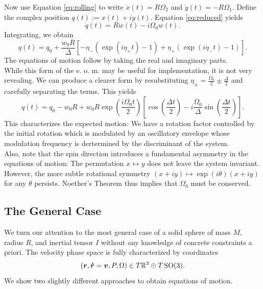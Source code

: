 Now use Equation \ref{eq:rolling} to write $\dot{x}(t)=R\Omega_2$ and $\dot{y}(t)=-R\Omega_1$. Define the complex position $q(t):=x(t)+iy(t)$. Equation \ref{eq:reduced} yields \[
    \dot{q}(t)= R\dot{w}(t)-i\Omega_0 w(t)
.\] Integrating, we obtain
\[
    q(t)=q_0 + \frac{w_0R}{\Delta}\left[-\eta_- (\exp(i\eta_+ t)-1)+\eta_+ (\exp(i\eta_-t)-1)\right]
.\] 
The equations of motion follow by taking the real and imaginary parts.\\
While this form of the e. o. m. may be useful for implementation, it is not very revealing. We can produce a clearer form by resubstituting $\eta_\pm = \frac{\Omega_0}{2} \pm \frac{\Delta}{2}$ and carefully separating the terms. This yields \[
    q(t)=q_0-w_0R+w_0R \exp\left(\frac{i\Omega_0t}{2}\right)\left[ \cos \left( \frac{\Delta t}{2}\right)- i\frac{\Omega_0}{\Delta} \sin\left( \frac{\Delta t}{2}\right)\right]
.\] This characterizes the expected motion: We have a rotation factor controlled by the initial rotation which is modulated by an oscillatory envelope whose modulation frequency is dertermined by the discriminant of the system. \\
Also, note that the spin direction introduces a fundamental asymmetry in the equations of motion: The permutation $x \leftrightarrow y$ does not leave the system invariant. However, the more subtle rotational symmetry $(x+iy) \mapsto \exp(i \theta) (x+iy)$ for any $\theta$ persists. Noether's Theorem thus implies that $\Omega_0$ must be conserved.
\subsection{The General Case}
We turn our attention to the most general case of a solid sphere of mass $M$, radius $R$, and inertial tensor $I$ without any knowledge of concrete constraints a priori. The velocity phase space is fully characterized by coordinates \[
    (\bm{r}, \bm{\dot{r}}=\bm{v}, P, \Omega) \in T\mathbb{R}^3 \oplus T\operatorname{SO} (3)
.\] We show two slightly different approaches to obtain equations of motion.
